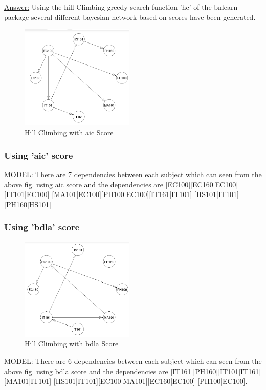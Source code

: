 \documentclass[15pt,journal]{IEEEtran}
\begin{document}
\underline{Answer:} 
Using the hill Climbing greedy search function 'hc' of the bnlearn package several different bayesian network based on scores have been generated.

\begin{figure}[H]%
\begin {center}
\includegraphics[width=0.48\textwidth]{images/Bayesian_aic.png}
\caption{Hill Climbing with aic Score} %
\label{fig:ecg}
\end {center}
\end{figure}

\subsubsection{Using {{\bf{'aic'}}} score}

MODEL: There are 7 dependencies between each subject which can seen from the above fig. using aic score and the dependencies are 
[EC100][EC160|EC100][IT101|EC100]
[MA101|EC100][PH100|EC100][IT161|IT101]
[HS101|IT101][PH160|HS101]



\subsubsection{Using {{\bf{'bdla'}}} score}
\begin{figure}[H]%
\begin {center}
\includegraphics[width=0.48\textwidth]{images/Bayesian_bdla.png}
\caption{Hill Climbing with bdla Score} %
\label{fig:ecg}
\end {center}
\end{figure}
MODEL: There are 6 dependencies between each subject which can seen from the above fig. using bdla score and the dependencies are  [IT161][PH160][IT101|IT161][MA101|IT101]
[HS101|IT101][EC100|MA101][EC160|EC100]
[PH100|EC100].
\end{document}
